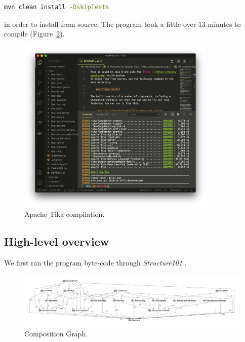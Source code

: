 \documentclass{article}
\begin{document}
\begin{lstlisting}[language=bash]
mvn clean install -DskipTests
\end{lstlisting}

in order to install from source. The program took a little over 13 minutes to compile (Figure~\ref{fig:compilation}).

\begin{figure}[ht]
    \centering
    \includegraphics[width=0.85\textwidth]{report/images/compiling-tika.png}
    \caption{Apache Tika compilation.}
    \label{fig:compilation}
\end{figure}

\subsection{High-level overview}
We first ran the program byte-code through \textit{Structure101} \citep{mcnamara_hickey_oreilly_chedgey_2018}.

\newpage
{}
\begin{figure}[ht]
    \centering
    \includegraphics[width=1\textwidth]{report/images/tika.png}
    \caption{Composition Graph.}
    \label{fig:compilation}
    
\end{figure}
\restoregeometry
\pagebreak
\end{document}
